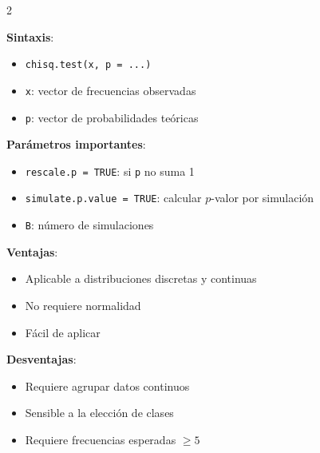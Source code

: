 \documentclass[10pt,a4paper]{article}
\begin{document}
\begin{multicols}{2}
    \begin{tcolorbox}[title=En R: chisq.test, equal height group=BA2]
        \textbf{Sintaxis}:
        \begin{itemize}
            \item \texttt{chisq.test(x, p = ...)}
            \item \texttt{x}: vector de frecuencias observadas
            \item \texttt{p}: vector de probabilidades teóricas
        \end{itemize}
        
        \textbf{Parámetros importantes}:
        \begin{itemize}
            \item \texttt{rescale.p = TRUE}: si \texttt{p} no suma 1
            \item \texttt{simulate.p.value = TRUE}: calcular $p$-valor por simulación
            \item \texttt{B}: número de simulaciones
        \end{itemize}
    \end{tcolorbox}
    \begin{tcolorbox}[title=Consideraciones, equal height group=BA2]
        \textbf{Ventajas}:
        \begin{itemize}
            \item Aplicable a distribuciones discretas y continuas
            \item No requiere normalidad
            \item Fácil de aplicar
        \end{itemize}
        
        \textbf{Desventajas}:
        \begin{itemize}
            \item Requiere agrupar datos continuos
            \item Sensible a la elección de clases
            \item Requiere frecuencias esperadas $\geq 5$
        \end{itemize}
    \end{tcolorbox}
\end{multicols}

\end{document}
